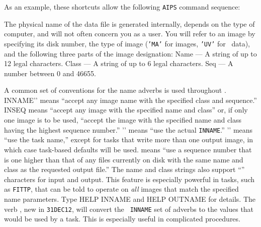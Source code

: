      As an example, these shortcuts allow the following {\tt AIPS} command
sequence:
\pd{}


     The physical name of the data file is generated internally,
depends on the type of computer, and will not often concern you as a
user. You will refer to an image by specifying its disk number, the
type of image ({\tt 'MA'} for images, {\tt 'UV'} for \uv\ data), and
the following three parts of the image designation:
\xben
\Item Name --- A string of up to 12 legal characters.
\Item Class --- A string of up to 6 legal characters.
\Item Seq --- A number between 0 and 46655.
\xeen
{}

     A common set of conventions for the name adverbs is used
throughout \AIPS\@. {\us INNAME\qs '\qs' \CR} means ``accept any
image name with the specified class and sequence.''  {\us INSEQ
\CR} means ``accept any image with the specified name and class'' or,
if only one image is to be used, ``accept the image with the specified
name and class having the highest sequence number.''  {\us
{}\qs '\qs' \CR} means ``use the actual {\tt INNAME}.''
{\us {}\qs '\qs' \CR} means ``use the task name,'' except
for tasks that write more than one output image, in which case
task-based defaults will be used.  {\us {} \CR} means
``use a sequence number that is one higher than that of any files
currently on disk with the same name and class as the requested output
file.'' The name and class strings also support ``''
characters for input and output.  This feature is especially powerful
in tasks, such as {\tt FITTP}, that can be told to operate on {\it
all\/} images that match the specified name parameters.  Type {\us
HELP INNAME \CR} and {\us HELP OUTNAME \CR} for details.  The verb
{\tt {}}, new in {\tt 31DEC12}, will convert the {\tt
INNAME} set of adverbs to the values that would be used by a task.
This is especially useful in complicated procedures.

